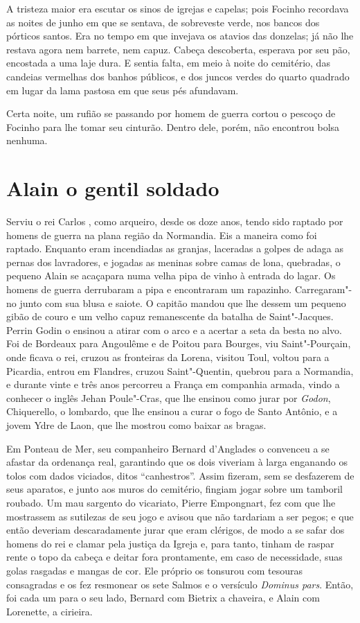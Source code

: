 A tristeza maior era escutar os sinos de igrejas e capelas; pois Focinho
recordava as noites de junho em que se sentava, de sobreveste verde, nos
bancos dos pórticos santos. Era no tempo em que invejava os atavios das
donzelas; já não lhe restava agora nem barrete, nem capuz. Cabeça
descoberta, esperava por seu pão, encostada a uma laje dura. E sentia
falta, em meio à noite do cemitério, das candeias vermelhas dos banhos
públicos, e dos juncos verdes do quarto quadrado em lugar da lama pastosa
em que seus pés afundavam.

Certa noite, um rufião se passando por homem de guerra cortou o pescoço de
Focinho para lhe tomar seu cinturão. Dentro dele, porém, não encontrou
bolsa nenhuma.

\chapter{Alain o gentil soldado}

Serviu o rei Carlos , como arqueiro, desde os doze anos, tendo sido
raptado por homens de guerra na plana região da Normandia. Eis a maneira
como foi raptado. Enquanto eram incendiadas as granjas, laceradas a golpes
de adaga as pernas dos lavradores, e jogadas as meninas sobre camas de
lona, quebradas, o pequeno Alain se acaçapara numa velha pipa de vinho à
entrada do lagar. Os homens de guerra derrubaram a pipa e encontraram um
rapazinho. Carregaram"-no junto com sua blusa e saiote. O capitão mandou
que lhe dessem um pequeno gibão de couro e um velho capuz remanescente da
batalha de Saint"-Jacques. Perrin Godin o ensinou a atirar com o arco e a
acertar a seta da besta no alvo. Foi de Bordeaux para Angoulême e de
Poitou para Bourges, viu Saint"-Pourçain, onde ficava o rei, cruzou as
fronteiras da Lorena, visitou Toul, voltou para a Picardia, entrou em
Flandres, cruzou Saint"-Quentin, quebrou para a Normandia, e durante vinte
e três anos percorreu a França em companhia armada, vindo a conhecer o
inglês Jehan Poule"-Cras, que lhe ensinou como jurar por \textit{Godon},
Chiquerello, o lombardo, que lhe ensinou a curar o fogo de Santo Antônio,
e a jovem Ydre de Laon, que lhe mostrou como baixar as bragas.

Em Ponteau de Mer, seu companheiro Bernard d’Anglades o convenceu a se
afastar da ordenança real, garantindo que os dois viveriam à larga
enganando os tolos com dados viciados, ditos “canhestros”. Assim fizeram,
sem se desfazerem de seus aparatos, e junto aos muros do cemitério,
fingiam jogar sobre um tamboril roubado. Um mau sargento do vicariato,
Pierre Empongnart, fez com que lhe mostrassem as sutilezas de seu jogo e
avisou que não tardariam a ser pegos; e que então deveriam descaradamente
jurar que eram clérigos, de modo a se safar dos homens do rei e clamar
pela justiça da Igreja e, para tanto, tinham de raspar rente o topo da
cabeça e deitar fora prontamente, em caso de necessidade, suas golas
rasgadas e mangas de cor. Ele próprio os tonsurou com tesouras consagradas
e os fez resmonear os sete Salmos e o versículo \textit{Dominus pars}.
Então, foi cada um para o seu lado, Bernard com Bietrix a chaveira, e Alain
com Lorenette, a cirieira.

